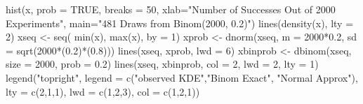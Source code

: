 \begin{Schunk}
\begin{Sinput}
  hist(x, prob = TRUE, breaks = 50,  xlab="Number of Successes Out of 2000 Experiments", main="481 Draws from Binom(2000, 0.2)")
  lines(density(x), lty = 2)
  xseq <- seq( min(x), max(x), by = 1)
  xprob <- dnorm(xseq, m = 2000*0.2, sd = sqrt(2000*(0.2)*(0.8)))
  lines(xseq, xprob, lwd = 6)
  xbinprob <- dbinom(xseq, size = 2000, prob = 0.2)
  lines(xseq, xbinprob, col = 2, lwd = 2, lty = 1)
  legend("topright", legend = c("observed KDE","Binom Exact", "Normal Approx"), lty = c(2,1,1), lwd = c(1,2,3), col = c(1,2,1))
\end{Sinput}
\end{Schunk}
